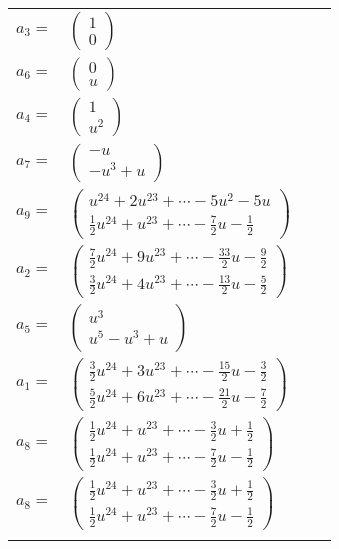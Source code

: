 \documentclass[1p]{elsarticle_modified}
\theoremstyle{definition}
\begin{document}
\begin{tabular}{m{7pt} m{180pt} m{7pt} m{180pt} }
\flushright $a_{3}=$&$\begin{pmatrix}1\\0\end{pmatrix}$ \\
\flushright $a_{6}=$&$\begin{pmatrix}0\\u\end{pmatrix}$ \\
\flushright $a_{4}=$&$\begin{pmatrix}1\\u^2\end{pmatrix}$ \\
\flushright $a_{7}=$&$\begin{pmatrix}- u\\- u^3+u\end{pmatrix}$ \\
\flushright $a_{9}=$&$\begin{pmatrix}u^{24}+2 u^{23}+\cdots-5 u^2-5 u\\\frac{1}{2} u^{24}+u^{23}+\cdots-\frac{7}{2} u-\frac{1}{2}\end{pmatrix}$ \\
\flushright $a_{2}=$&$\begin{pmatrix}\frac{7}{2} u^{24}+9 u^{23}+\cdots-\frac{33}{2} u-\frac{9}{2}\\\frac{3}{2} u^{24}+4 u^{23}+\cdots-\frac{13}{2} u-\frac{5}{2}\end{pmatrix}$ \\
\flushright $a_{5}=$&$\begin{pmatrix}u^3\\u^5- u^3+u\end{pmatrix}$ \\
\flushright $a_{1}=$&$\begin{pmatrix}\frac{3}{2} u^{24}+3 u^{23}+\cdots-\frac{15}{2} u-\frac{3}{2}\\\frac{5}{2} u^{24}+6 u^{23}+\cdots-\frac{21}{2} u-\frac{7}{2}\end{pmatrix}$ \\
\flushright $a_{8}=$&$\begin{pmatrix}\frac{1}{2} u^{24}+u^{23}+\cdots-\frac{3}{2} u+\frac{1}{2}\\\frac{1}{2} u^{24}+u^{23}+\cdots-\frac{7}{2} u-\frac{1}{2}\end{pmatrix}$\\ \flushright $a_{8}=$&$\begin{pmatrix}\frac{1}{2} u^{24}+u^{23}+\cdots-\frac{3}{2} u+\frac{1}{2}\\\frac{1}{2} u^{24}+u^{23}+\cdots-\frac{7}{2} u-\frac{1}{2}\end{pmatrix}$\\&\end{tabular}
\end{document}
